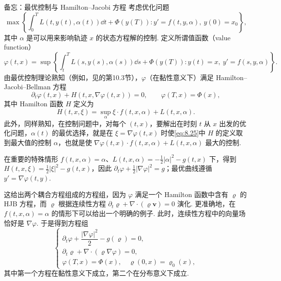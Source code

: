 \begin{sourcebox}{备忘：最优控制与 Hamilton--Jacobi 方程}\label{box:8.3}
考虑优化问题
\[
\max\left\{\int_0^TL(t,y(t),\alpha(t))\dd t+\Phi(y(T)):
y'=f(t,y,\alpha),\ y(0)=x_0\right\},
\]
其中 $\alpha$ 是可以用来影响轨迹 $x$ 的状态方程解的控制. 定义所谓值函数（value function）
\[
\varphi(t,x)=\sup\left\{\int_t^TL(s,y(s),\alpha(s))\dd s+\Phi(y(T)):
y(t)=x,\ y'=f(s,y,\alpha)\right\}.
\]
由最优控制理论熟知（例如，见\cite{b158}的第10.3节），$\varphi$（在黏性意义下）满足 Hamilton--Jacobi--Bellman 方程
\[
\partial_t\varphi(t,x)+H(t,x,\nabla\varphi(t,x))=0,
\qquad\varphi(T,x)=\Phi(x),
\]
其中 Hamilton 函数 $H$ 定义为
\begin{equation}\label{eq:8.25}
H(t,x,\xi)=\sup_\alpha\xi\cdot f(t,x,\alpha)+L(t,x,\alpha).
\end{equation}
此外，同样熟知，在控制问题中，对每个 $(t,x)$，要解出在时刻 $t$ 从 $x$ 出发的优化问题，$\alpha(t)$ 的最优选择，就是在 $\xi=\nabla\varphi(t,x)$ 时使\eqref{eq:8.25}中 $H$ 的定义取到最大值的控制 $\alpha$，也就是使 $\nabla\varphi(t,x)\cdot f(t,x,\alpha)+L(t,x,\alpha)$ 最大的控制.

在重要的特殊情形 $f(t,x,\alpha)=\alpha$、$L(t,x,\alpha)=-\frac12|\alpha|^2-g(t,x)$ 下，得到 $H(t,x,\xi)=\frac12|\xi|^2-g(t,x)$，因此 $\partial_t\varphi+\frac12|\nabla\varphi|^2=g$；最优曲线遵循 $y'=\nabla\varphi(t,y)$.
\end{sourcebox}

这给出两个耦合方程组成的方程组，因为 $\varphi$ 满足一个 Hamilton 函数中含有 $\varrho$ 的 HJB 方程，而 $\varrho$ 根据连续性方程 $\partial_t\varrho+\nabla\cdot(\varrho\mathbf v)=0$ 演化. 更准确地，在 $f(t,x,\alpha)=\alpha$ 的情形下可以给出一个明确的例子. 此时，连续性方程中的向量场恰好是 $\nabla\varphi$. 于是得到方程组
\begin{equation}\label{eq:8.26}
\begin{cases}
\partial_t\varphi+\dfrac{|\nabla\varphi|^2}2-g(\varrho)=0,\\
\partial_t\varrho+\nabla\cdot(\varrho\nabla\varphi)=0,\\
\varphi(T,x)=\Phi(x),\quad\varrho(0,x)=\varrho_0(x),
\end{cases}
\end{equation}
其中第一个方程在黏性意义下成立，第二个在分布意义下成立.

